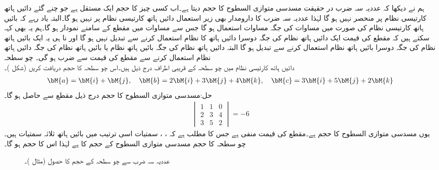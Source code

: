 ہم نے دیکھا کہ عددیہ سہ ضرب در حقیقت مسدسی متوازی السطوح کا حجم دیتا ہے۔اب کسی چیز کا حجم ایک مستقل ہے جو چنے گئے دائیں ہاتھ کارتیسی نظام پر منحصر نہیں ہو گا لہٰذا عددیہ سہ ضرب کا دارومدار بھی زیر استعمال دائیں ہاتھ کارتیسی  نظام پر نہیں ہو گا۔البتہ یاد رہے کہ بائیں ہاتھ کارتیسی نظام کی صورت میں مساوات  کی جگہ مساوات  استعمال ہو گا جس سے مساوات  میں مقطع کے سامنے  نمودار ہو گا۔ہم یہ بھی کہہ سکتے ہیں کہ مقطع کی قیمت ایک دائیں ہاتھ نظام کی جگہ دوسرا دائیں ہاتھ کا نظام استعمال کرنے سے تبدیل نہیں ہو گا اور نا ہی یہ ایک بائیں ہاتھ نظام کی جگہ دوسرا بائیں ہاتھ نظام استعمال کرنے سے تبدیل ہو گا البتہ دائیں ہاتھ نظام کی جگہ بائیں ہاتھ نظام یا بائیں ہاتھ نظام کی جگہ دائیں ہاتھ نظام استعمال کرنے سے مقطع کی قیمت  سے ضرب ہو گی۔  
\quad چو سطحہ\\
دائیں ہاتھ کارتیسی نظام میں چو سطحہ کے قریبی اطراف درج ذیل ہیں۔اس چو سطحہ کا حجم دریافت کریں (شکل )۔
\begin{align*}
\bM{a}=\bM{i}+\bM{j},\quad \bM{b}=2\bM{i}+3\bM{j}+4\bM{k},\quad \bM{c}=3\bM{i}+5\bM{j}+2\bM{k}
\end{align*}
حل:مسدسی متوازی السطوح کا حجم درج ذیل مقطع سے حاصل ہو گا۔
\begin{align*}
\begin{vmatrix}1&1&0\\2&3&4\\3&5&2  \end{vmatrix}=-6
\end{align*}
یوں مسدسی متوازی السطوح کا حجم  ہے۔مقطع کی قیمت منفی ہے جس کا مطلب ہے کہ ، ،  سمتیات اسی ترتیب میں بائیں ہاتھ ثلاثہ سمتیات ہیں۔چو سطحہ کا حجم مسدسی متوازی السطوح کے حجم کا  ہے لہٰذا اس کا حجم  ہو گا۔
\begin{figure}
\centering
{}
\caption{عددیہ سہ ضرب سے چو سطحہ کے حجم کا حصول (مثال )۔}
\label{شکل_مثال_الجبرا_چو_سطحہ}
\end{figure}


